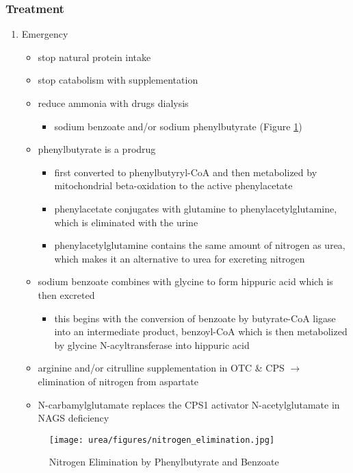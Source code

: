 \documentclass[12pt]{scrartcl}
\begin{document}
\begin{center}
\begin{center}
\subsubsection{Treatment}
\label{sec:orgfb9dcd9}
\begin{enumerate}
\item Emergency
\label{sec:orgf0b1d77}
\begin{itemize}
\item stop natural protein intake
\item stop catabolism with supplementation
\item reduce ammonia with drugs \textpm{} dialysis
\begin{itemize}
\item sodium benzoate and/or sodium phenylbutyrate (Figure \ref{fig:orgb5eb1ea})
\end{itemize}

\item phenylbutyrate is a prodrug
\begin{itemize}
\item first converted to phenylbutyryl-CoA and then metabolized by mitochondrial
beta-oxidation to the active phenylacetate
\item phenylacetate conjugates with glutamine to phenylacetylglutamine,
which is eliminated with the urine
\item phenylacetylglutamine contains the same amount of nitrogen as
urea, which makes it an alternative to urea for excreting nitrogen
\end{itemize}

\item sodium benzoate combines with glycine to form hippuric acid which is
then excreted
\begin{itemize}
\item this begins with the conversion of benzoate by butyrate-CoA ligase
into an intermediate product, benzoyl-CoA which is then
metabolized by glycine N-acyltransferase into hippuric acid
\end{itemize}
\item arginine and/or citrulline supplementation in OTC \& CPS \(\to\) elimination of nitrogen from aspartate
\item N-carbamylglutamate replaces the CPS1 activator N-acetylglutamate in NAGS deficiency
\end{itemize}


\begin{figure}[htbp]
\centering
\texttt{[image: urea/figures/nitrogen\_elimination.jpg]}
\caption{\label{fig:orgb5eb1ea}Nitrogen Elimination by Phenylbutyrate and Benzoate}
\end{figure}


\end{enumerate}
\end{center}
\end{center}
\end{document}

